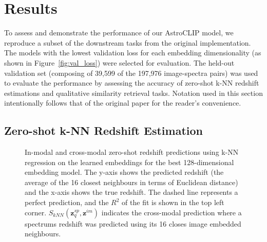 
\section{Results}\label{sec:results}
To assess and demonstrate the performance of our AstroCLIP model, we reproduce a subset of the downstream tasks from
the original implementation.
The models with the lowest validation loss for each embedding dimensionality (as shown in Figure~\eqref{fig:val_loss})
were selected for evaluation.
The held-out validation set (composing of 39,599 of the 197,976 image-spectra pairs) was used to evaluate the performance
by assessing the accuracy of zero-shot k-NN redshift estimations and qualitative similarity retrieval tasks.
Notation used in this section intentionally follows that of the original paper for the reader's convenience.

\subsection{Zero-shot k-NN Redshift Estimation}\label{subsec:results-redshift-regression}

\begin{figure}[t]
    \centering
    \caption{In-modal and cross-modal zero-shot redshift predictions using k-NN regression on the learned embeddings for the
    best 128-dimensional embedding model.
    The y-axis shows the predicted redshift (the average of the 16 closest neighbours in terms of Euclidean distance) and the x-axis shows the true redshift.
    The dashed line represents a perfect prediction, and the $R^{2}$ of the fit is shown in the top left corner.
    $S_{kNN}(\mathbf{z}_{q}^{sp}, \mathbf{z}^{im})$ indicates the cross-modal prediction where a spectrums redshift was
    predicted using its 16 closes image embedded neighbours.}
    \label{fig:rkr}
\end{figure}

